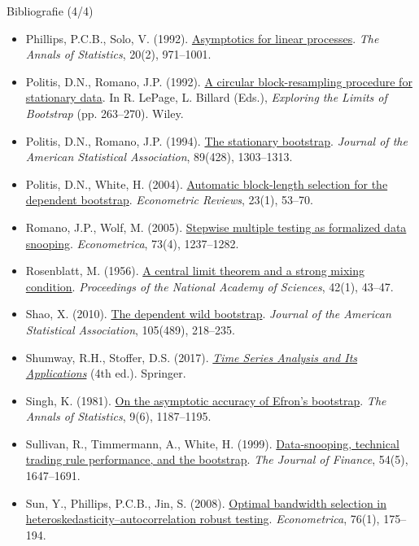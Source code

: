 \begin{frame}{Bibliografie (4/4)}
\itemsize{\tiny}
\begin{itemize}
    \item Phillips, P.C.B., Solo, V. (1992). \href{https://doi.org/10.1214/aos/1176348666}{Asymptotics for linear processes}. \emph{The Annals of Statistics}, 20(2), 971--1001.
    \item Politis, D.N., Romano, J.P. (1992). \href{https://openlibrary.org/books/OL1551704M}{A circular block-resampling procedure for stationary data}. In R. LePage, L. Billard (Eds.), \emph{Exploring the Limits of Bootstrap} (pp. 263--270). Wiley.
    \item Politis, D.N., Romano, J.P. (1994). \href{https://doi.org/10.1080/01621459.1994.10476870}{The stationary bootstrap}. \emph{Journal of the American Statistical Association}, 89(428), 1303--1313.
    \item Politis, D.N., White, H. (2004). \href{https://doi.org/10.1081/ETC-120028836}{Automatic block-length selection for the dependent bootstrap}. \emph{Econometric Reviews}, 23(1), 53--70.
    \item Romano, J.P., Wolf, M. (2005). \href{https://doi.org/10.1111/j.1468-0262.2005.00615.x}{Stepwise multiple testing as formalized data snooping}. \emph{Econometrica}, 73(4), 1237--1282.
    \item Rosenblatt, M. (1956). \href{https://doi.org/10.1073/pnas.42.1.43}{A central limit theorem and a strong mixing condition}. \emph{Proceedings of the National Academy of Sciences}, 42(1), 43--47.
    \item Shao, X. (2010). \href{https://doi.org/10.1198/jasa.2009.tm08744}{The dependent wild bootstrap}. \emph{Journal of the American Statistical Association}, 105(489), 218--235.
    \item Shumway, R.H., Stoffer, D.S. (2017). \href{https://doi.org/10.1007/978-3-319-52452-8}{\emph{Time Series Analysis and Its Applications}} (4th ed.). Springer.
    \item Singh, K. (1981). \href{https://doi.org/10.1214/aos/1176345636}{On the asymptotic accuracy of Efron's bootstrap}. \emph{The Annals of Statistics}, 9(6), 1187--1195.
    \item Sullivan, R., Timmermann, A., White, H. (1999). \href{https://doi.org/10.1111/0022-1082.00163}{Data-snooping, technical trading rule performance, and the bootstrap}. \emph{The Journal of Finance}, 54(5), 1647--1691.
    \item Sun, Y., Phillips, P.C.B., Jin, S. (2008). \href{https://doi.org/10.1111/j.0012-9682.2008.00822.x}{Optimal bandwidth selection in heteroskedasticity--autocorrelation robust testing}. \emph{Econometrica}, 76(1), 175--194.

\end{itemize}
\end{frame}
